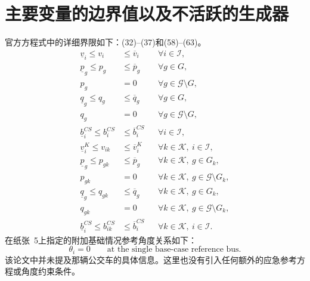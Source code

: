 \documentclass{article}
\begin{document}
\section*{主要变量的边界值以及不活跃的生成器}
官方方程式中的详细界限如下：(32)–(37)和(58)–(63)。
\begin{align*}
\underline v_i\leq v_i&\leq\overline v_i &&\forall i\in\mathcal I,\\
\underline p_g\leq p_g&\leq\overline p_g &&\forall g\in G,\\
p_g&=0 &&\forall g\in\mathcal G\setminus G,\\
\underline q_g\leq q_g&\leq\overline q_g &&\forall g\in G,\\
q_g&=0 &&\forall g\in\mathcal G\setminus G,\\
\underline b_i^{CS}\leq b_i^{CS}&\leq\overline b_i^{CS} &&\forall i\in\mathcal I,\\
\underline v_i^K\leq v_{ik}&\leq\overline v_i^K &&\forall k\in\mathcal K,\ i\in\mathcal I,\\
\underline p_g\leq p_{gk}&\leq\overline p_g &&\forall k\in\mathcal K,\ g\in G_k,\\
p_{gk}&=0 &&\forall k\in\mathcal K,\ g\in\mathcal G\setminus G_k,\\
\underline q_g\leq q_{gk}&\leq\overline q_g &&\forall k\in\mathcal K,\ g\in G_k,\\
q_{gk}&=0 &&\forall k\in\mathcal K,\ g\in\mathcal G\setminus G_k,\\
\underline b_i^{CS}\leq b_{ik}^{CS}&\leq\overline b_i^{CS} &&\forall k\in\mathcal K,\ i\in\mathcal I.
\end{align*}
在纸张~5上指定的附加基础情况参考角度关系如下：
\[
\theta_i=0\qquad\text{at the single base-case reference bus.}
\]
该论文中并未提及那辆公交车的具体信息。这里也没有引入任何额外的应急参考方程或角度约束条件。
\end{document}
